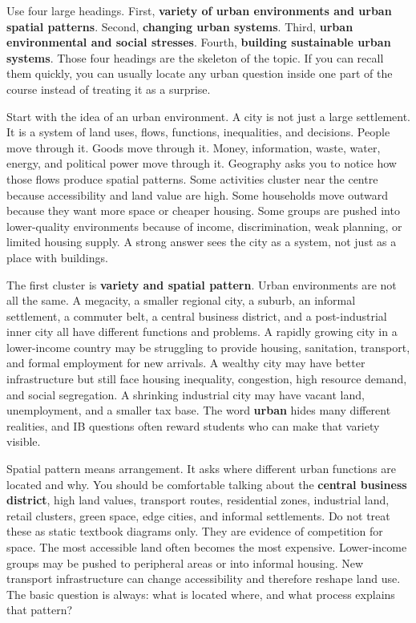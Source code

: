 \documentclass[11pt,a4paper]{article}
\newcommand{\term}[1]{\textcolor{HeadingBlue}{\textbf{#1}}}
\begin{document}
Use four large headings. First, \term{variety of urban environments and urban
spatial patterns}. Second, \term{changing urban systems}. Third,
\term{urban environmental and social stresses}. Fourth, \term{building
sustainable urban systems}. Those four headings are the skeleton of the topic.
If you can recall them quickly, you can usually locate any urban question inside
one part of the course instead of treating it as a surprise.

Start with the idea of an urban environment. A city is not just a large
settlement. It is a system of land uses, flows, functions, inequalities, and
decisions. People move through it. Goods move through it. Money, information,
waste, water, energy, and political power move through it. Geography asks you
to notice how those flows produce spatial patterns. Some activities cluster
near the centre because accessibility and land value are high. Some households
move outward because they want more space or cheaper housing. Some groups are
pushed into lower-quality environments because of income, discrimination, weak
planning, or limited housing supply. A strong answer sees the city as a system,
not just as a place with buildings.

The first cluster is \term{variety and spatial pattern}. Urban environments are
not all the same. A megacity, a smaller regional city, a suburb, an informal
settlement, a commuter belt, a central business district, and a post-industrial
inner city all have different functions and problems. A rapidly growing city in
a lower-income country may be struggling to provide housing, sanitation,
transport, and formal employment for new arrivals. A wealthy city may have
better infrastructure but still face housing inequality, congestion, high
resource demand, and social segregation. A shrinking industrial city may have
vacant land, unemployment, and a smaller tax base. The word \term{urban} hides
many different realities, and IB questions often reward students who can make
that variety visible.

Spatial pattern means arrangement. It asks where different urban functions are
located and why. You should be comfortable talking about the \term{central
business district}, high land values, transport routes, residential zones,
industrial land, retail clusters, green space, edge cities, and informal
settlements. Do not treat these as static textbook diagrams only. They are
evidence of competition for space. The most accessible land often becomes the
most expensive. Lower-income groups may be pushed to peripheral areas or into
informal housing. New transport infrastructure can change accessibility and
therefore reshape land use. The basic question is always: what is located where,
and what process explains that pattern?
\end{document}
